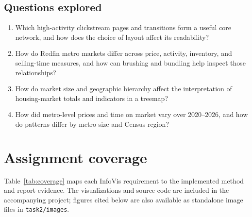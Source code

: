 \documentclass[11pt,letterpaper]{article}
\begin{document}
\subsection{Questions explored}
\begin{enumerate}[leftmargin=*]
  \item Which high-activity clickstream pages and transitions form a useful core network, and how does the choice of layout affect its readability?
  \item How do Redfin metro markets differ across price, activity, inventory, and selling-time measures, and how can brushing and bundling help inspect those relationships?
  \item How do market size and geographic hierarchy affect the interpretation of housing-market totals and indicators in a treemap?
  \item How did metro-level prices and time on market vary over 2020--2026, and how do patterns differ by metro size and Census region?
\end{enumerate}

\section{Assignment coverage}
Table~\ref{tab:coverage} maps each InfoVis requirement to the implemented method and report evidence. The visualizations and source code are included in the accompanying project; figures cited below are also available as standalone image files in \texttt{task2/images}.
\end{document}

